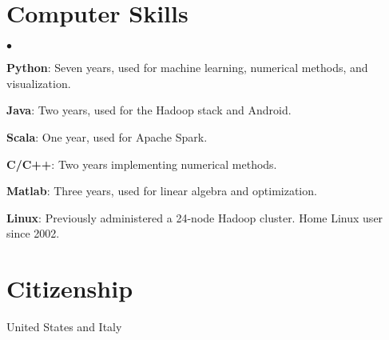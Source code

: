 \documentclass[margin,line]{res}
\newenvironment{list2}{
  \begin{list}{$\bullet$}{%
      \setlength{\itemsep}{0in}
      \setlength{\parsep}{0in} \setlength{\parskip}{0in}
      \setlength{\topsep}{0in} \setlength{\partopsep}{0in}
      \setlength{\leftmargin}{0.2in}}}{\end{list}}
\begin{document}
\begin{resume}
\section{\sc Computer Skills}
\begin{list2}
\item[]{\bf Python}: Seven years, used for machine learning, numerical methods, and visualization.
\item[]{\bf Java}: Two years, used for the Hadoop stack and Android.
\item[]{\bf Scala}: One year, used for Apache Spark.
\item[]{\bf C/C++}: Two years implementing numerical methods.
\item[]{\bf Matlab}: Three years, used for linear algebra and optimization.
\item[]{\bf Linux}: Previously administered a 24-node Hadoop cluster. Home Linux user since 2002.
\end{list2}

\section{\sc Citizenship}
United States and Italy

\end{resume}
\end{document}
